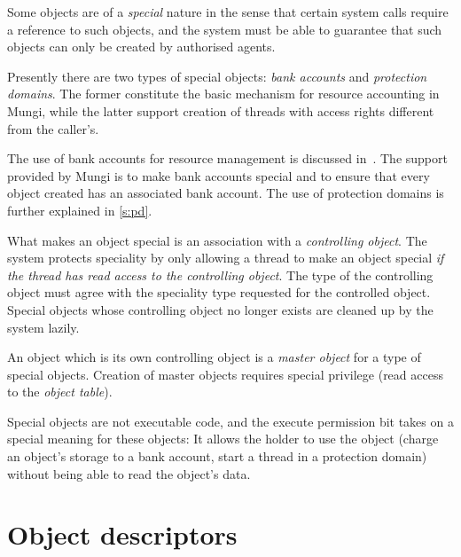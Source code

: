 \documentclass[a4paper,11pt,twoside,dvips]{report}
\begin{document}
Some objects are of a \emph{special} nature in the sense that certain
system calls require a reference to such objects, and the system must be
able to guarantee that such objects can only be created by authorised
agents.

Presently there are two types of special objects: \emph{bank accounts}
and \emph{protection domains}. The former constitute the basic mechanism
for resource accounting in Mungi, while the latter support creation of
threads with access rights different from the caller's.

The use of bank accounts for resource management is discussed
in~\cite{Heiser_LR_98}. The support provided by Mungi is to make bank
accounts special and to ensure that every object created has an
associated bank account. The use of protection domains is further
explained in \autoref{s:pd}.

What makes an object special is an association with a \emph{controlling
object}. The system protects speciality by only allowing a thread to
make an object special \emph{if the thread has read access to the
controlling object}. The type of the controlling object must agree with
the speciality type requested for the controlled object. Special objects
whose controlling object no longer exists are cleaned up by the system
lazily.

An object which is its own controlling object is a \emph{master object}
for a type of special objects. Creation of master objects requires
special privilege (read access to the \emph{object table}).

Special objects are not executable code, and the execute permission bit
takes on a special meaning for these objects: It allows the holder to
use the object (charge an object's storage to a bank account, start a
thread in a protection domain) without being able to read the object's
data.


\section{\label{s:ot}Object descriptors}
\end{document}
